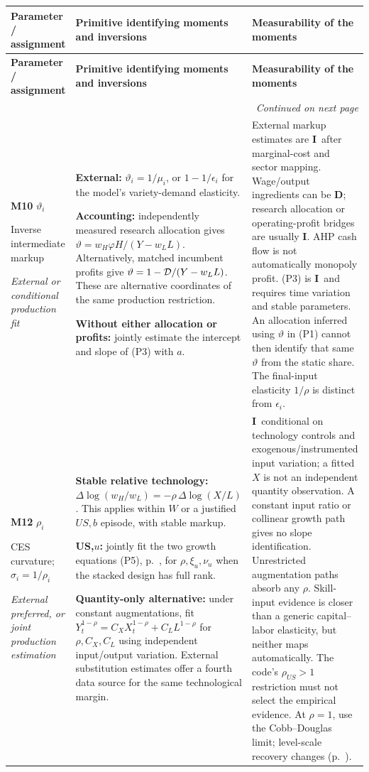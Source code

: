 \documentclass[10pt,a4paper,landscape]{article}
\makeatletter
\newcommand{\dd}{\Delta\log}
\newcommand{\direct}{\textbf{D}}
\newcommand{\indirect}{\textbf{I}}
\newcommand{\route}[1]{\par\textit{#1}}
\newenvironment{momenttable}{%
\fontsize{9.5}{11.2}\selectfont\setlength{\parskip}{3pt}
\begin{longtable}{@{}P{\dimexpr .16\textwidth-6.67pt\relax}P{\dimexpr .49\textwidth-6.67pt\relax}P{\dimexpr .35\textwidth-6.66pt\relax}@{}}
\toprule\rowcolor{tablehead}\textbf{Parameter / assignment} & \textbf{Primitive identifying moments and inversions} & \textbf{Measurability of the moments}\\\midrule
\endfirsthead
\toprule\rowcolor{tablehead}\textbf{Parameter / assignment} & \textbf{Primitive identifying moments and inversions} & \textbf{Measurability of the moments}\\\midrule
\endhead
\midrule\multicolumn{3}{r}{\footnotesize\itshape Continued on next page}\\\endfoot
\bottomrule\endlastfoot
}{\end{longtable}}
\makeatother
\begin{document}
\begin{momenttable}
\textbf{M10} $\vartheta_i$\par Inverse intermediate markup\route{External or conditional production fit}
& \textbf{External:} $\vartheta_i=1/\mu_i$, or $1-1/\epsilon_i$ for the model's variety-demand elasticity.\par
\textbf{Accounting:} independently measured research allocation gives
\(\vartheta=w_H\varphi H/(Y-w_LL)\).
Alternatively, matched incumbent profits give
\(\vartheta=1-\mathcal D/(Y-w_LL)\).
These are alternative coordinates of the same production restriction.\par
\textbf{Without either allocation or profits:} jointly estimate the intercept and slope of (P3) with $a$.
& External markup estimates are \indirect\ after marginal-cost and sector mapping. Wage/output ingredients can be \direct; research allocation or operating-profit bridges are usually \indirect. AHP cash flow is not automatically monopoly profit. (P3) is \indirect\ and requires time variation and stable parameters. An allocation inferred using $\vartheta$ in (P1) cannot then identify that same $\vartheta$ from the static share. The final-input elasticity $1/\rho$ is distinct from $\epsilon_i$.\\[5pt]
\textbf{M12} $\rho_i$\par CES curvature; $\sigma_i=1/\rho_i$\route{External preferred, or joint production estimation}
& \textbf{Stable relative technology:}
\(\dd(w_H/w_L)=-\rho\,\dd(X/L)\).
This applies within $W$ or a justified $US,b$ episode, with stable markup.\par
\textbf{US,$u$:} jointly fit the two growth equations (P5), p.~\pageref{sec:growth}, for $\rho,\xi_u,\nu_u$ when the stacked design has full rank.\par
\textbf{Quantity-only alternative:} under constant augmentations, fit
\(Y_t^{1-\rho}=C_X X_t^{1-\rho}+C_L L^{1-\rho}\)
for $\rho,C_X,C_L$ using independent input/output variation. External substitution estimates offer a fourth data source for the same technological margin.
& \indirect\ conditional on technology controls and exogenous/instrumented input variation; a fitted $X$ is not an independent quantity observation. A constant input ratio or collinear growth path gives no slope identification. Unrestricted augmentation paths absorb any $\rho$. Skill-input evidence is closer than a generic capital--labor elasticity, but neither maps automatically. The code's $\rho_{US}>1$ restriction must not select the empirical evidence. At $\rho=1$, use the Cobb--Douglas limit; level-scale recovery changes (p.~\pageref{sec:scales}).\\[3pt]
\end{momenttable}
\end{document}

